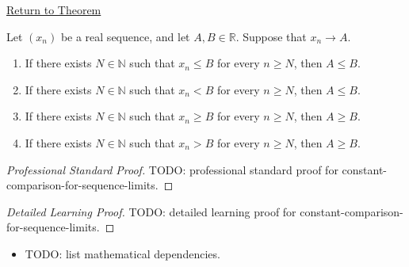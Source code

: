 \newpage
{}
\label{prf:constant-comparison-for-sequence-limits}

\begin{remark*}[Return]
\hyperref[thm:constant-comparison-for-sequence-limits]{Return to Theorem}
\end{remark*}

\begin{theorem*}
Let $(x_n)$ be a real sequence, and let $A,B\in\mathbb{R}$. Suppose
that $x_n\to A$.
\begin{enumerate}[label=(\alph*)]
  \item If there exists $N\in\mathbb{N}$ such that $x_n\le B$ for every
  $n\ge N$, then $A\le B$.
  \item If there exists $N\in\mathbb{N}$ such that $x_n<B$ for every
  $n\ge N$, then $A\le B$.
  \item If there exists $N\in\mathbb{N}$ such that $x_n\ge B$ for every
  $n\ge N$, then $A\ge B$.
  \item If there exists $N\in\mathbb{N}$ such that $x_n>B$ for every
  $n\ge N$, then $A\ge B$.
\end{enumerate}

\smallskip
\noindent
\end{theorem*}

\begin{proof}[Professional Standard Proof]
\LRAProofBodyStart
TODO: professional standard proof for constant-comparison-for-sequence-limits.
\end{proof}

\begin{proof}[Detailed Learning Proof]
\LRAProofBodyStart
TODO: detailed learning proof for constant-comparison-for-sequence-limits.
\end{proof}

\begin{remark*}
\end{remark*}

\begin{dependencies}
\begin{itemize}
  \item TODO: list mathematical dependencies.
\end{itemize}
\end{dependencies}

\clearpage
